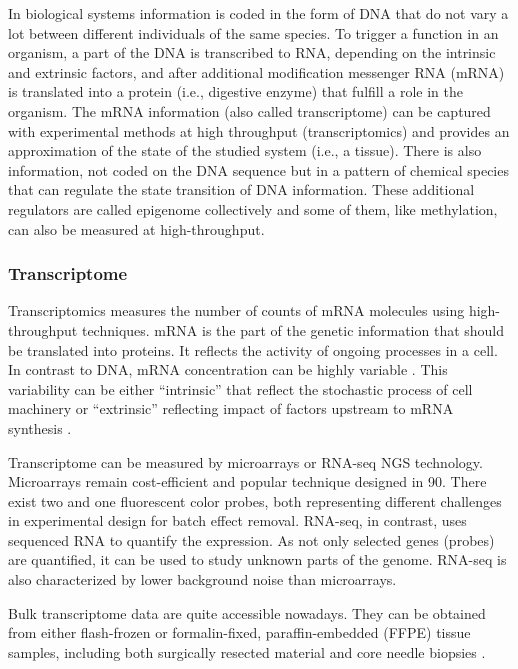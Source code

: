\documentclass[12pt,]{book}
\theoremstyle{definition}
\theoremstyle{definition}
\theoremstyle{definition}
\theoremstyle{remark}
\begin{document}
In biological systems information is coded in the form of DNA that do
not vary a lot between different individuals of the same species. To
trigger a function in an organism, a part of the DNA is transcribed to
RNA, depending on the intrinsic and extrinsic factors, and after
additional modification messenger RNA (mRNA) is translated into a
protein (i.e., digestive enzyme) that fulfill a role in the organism.
The mRNA information (also called transcriptome) can be captured with
experimental methods at high throughput (transcriptomics) and provides
an approximation of the state of the studied system (i.e., a tissue).
There is also information, not coded on the DNA sequence but in a
pattern of chemical species that can regulate the state transition of
DNA information. These additional regulators are called epigenome
collectively and some of them, like methylation, can also be measured at
high-throughput.

\hypertarget{transcriptome}{%
\subsubsection{Transcriptome}\label{transcriptome}}

Transcriptomics measures the number of counts of mRNA molecules using
high-throughput techniques. mRNA is the part of the genetic information
that should be translated into proteins. It reflects the activity of
ongoing processes in a cell. In contrast to DNA, mRNA concentration can
be highly variable \citep{Velculescu1997}. This variability can be
either ``intrinsic'' that reflect the stochastic process of cell
machinery or ``extrinsic'' reflecting impact of factors upstream to mRNA
synthesis \citep{Satija2014}.

Transcriptome can be measured by microarrays or RNA-seq NGS technology.
Microarrays remain cost-efficient and popular technique designed in 90.
There exist two and one fluorescent color probes, both representing
different challenges in experimental design for batch effect removal.
RNA-seq, in contrast, uses sequenced RNA to quantify the expression. As
not only selected genes (probes) are quantified, it can be used to study
unknown parts of the genome. RNA-seq is also characterized by lower
background noise than microarrays.

Bulk transcriptome data are quite accessible nowadays. They can be
obtained from either flash-frozen or formalin-fixed, paraffin-embedded
(FFPE) tissue samples, including both surgically resected material and
core needle biopsies \citep{Schelker2017}.
\end{document}
